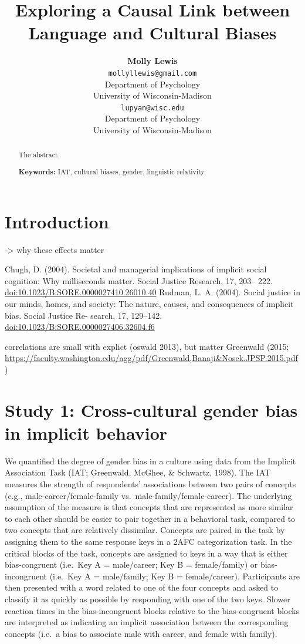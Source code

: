 \documentclass[10pt, letterpaper]{article}
\title{Exploring a Causal Link between Language and Cultural Biases}
\author{{\large \bf Molly Lewis} \\ \texttt{mollyllewis@gmail.com} \\ Department of Psychology  \\ University of Wisconsin-Madison \And {\large \bf Gary Lupyan} \\ \texttt{lupyan@wisc.edu} \\ Department of Psychology  \\ University of Wisconsin-Madison}
\begin{document}
\maketitle

\begin{abstract}
The abstract.

\textbf{Keywords:}
IAT, cultural biases, gender, linguistic relativity.
\end{abstract}

\section{Introduction}\label{introduction}

-\textgreater{} why these effects matter

Chugh, D. (2004). Societal and managerial implications of implicit
social cognition: Why milliseconds matter. Social Justice Research, 17,
203-- 222. \url{doi:10.1023/B:SORE.0000027410.26010.40} Rudman, L. A.
(2004). Social justice in our minds, homes, and society: The nature,
causes, and consequences of implicit bias. Social Justice Re- search,
17, 129--142. \url{doi:10.1023/B:SORE.0000027406.32604.f6}

correlations are small with explict (oswald 2013), but matter Greenwald
(2015;
\url{https://faculty.washington.edu/agg/pdf/Greenwald,Banaji\&Nosek.JPSP.2015.pdf})

\section{Study 1: Cross-cultural gender bias in implicit
behavior}\label{study-1-cross-cultural-gender-bias-in-implicit-behavior}

We quantified the degree of gender bias in a culture using data from the
Implicit Association Task (IAT; Greenwald, McGhee, \& Schwartz, 1998).
The IAT measures the strength of respondents' associations between two
pairs of concepts (e.g., male-career/female-family
vs.~male-family/female-career). The underlying assumption of the measure
is that concepts that are represented as more similar to each other
should be easier to pair together in a behavioral task, compared to two
concepts that are relatively dissimilar. Concepts are paired in the task
by assigning them to the same response keys in a 2AFC categorization
task. In the critical blocks of the task, concepts are assigned to keys
in a way that is either bias-congruent (i.e.~Key A = male/career; Key B
= female/family) or bias-incongruent (i.e.~Key A = male/family; Key B =
female/career). Participants are then presented with a word related to
one of the four concepts and asked to classify it as quickly as possible
by responding with one of the two keys. Slower reaction times in the
bias-incongruent blocks relative to the bias-congruent blocks are
interpreted as indicating an implicit association between the
corresponding concepts (i.e.~a bias to associate male with career, and
female with family).
\end{document}
